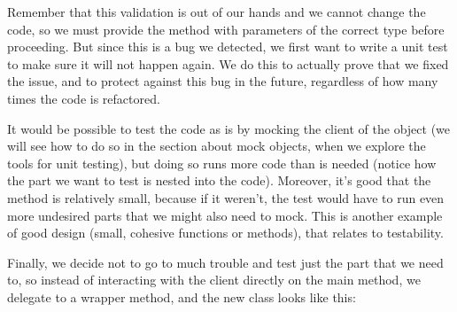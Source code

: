 \documentclass[a4paper,10pt,english]{sphinxmanual}
\begin{document}
\begin{sphinxVerbatim}[commandchars=\\\{\}]
    
 
     
\end{sphinxVerbatim}

Remember that this validation is out of our hands and we cannot change the code, so we
must provide the method with parameters of the correct type before proceeding. But since
this is a bug we detected, we first want to write a unit test to make sure it will not happen
again. We do this to actually prove that we fixed the issue, and to protect against this bug in
the future, regardless of how many times the code is refactored.

It would be possible to test the code as is by mocking the client of the  object (we
will see how to do so in the section about mock objects, when we explore the tools for unit
testing), but doing so runs more code than is needed (notice how the part we want to test is
nested into the code). Moreover, it’s good that the method is relatively small, because if it
weren’t, the test would have to run even more undesired parts that we might also need to
mock. This is another example of good design (small, cohesive functions or methods), that
relates to testability.

Finally, we decide not to go to much trouble and test just the part that we need to, so
instead of interacting with the client directly on the main method, we delegate to a
wrapper method, and the new class looks like this:

\begin{sphinxVerbatim}[commandchars=\\\{\}]
 
     
          
       
          

 
     
          
         
\end{sphinxVerbatim}
\end{document}
